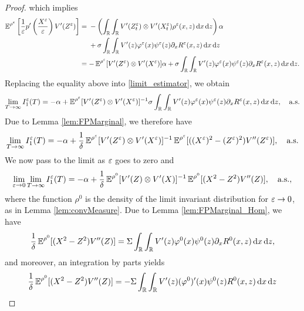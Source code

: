 \documentclass[10pt]{article}
\begin{document}
\begin{proof}
which implies
\begin{align}
	\operatorname{\mathbb{E}}^{\rho^\varepsilon} \left [ \frac{1}{\varepsilon} p' \left ( \frac{X^\varepsilon}{\varepsilon} \right ) V'(Z^\varepsilon) \right ] &= 
	\begin{aligned}[t]
		&- \left(\int_{\mathbb{R}} \int_{\mathbb{R}} V'(Z^\varepsilon_t) \otimes V'(X^\varepsilon_t) \rho^\varepsilon(x, z) \,\mathrm{d} x \,\mathrm{d} z\right) \alpha \\
		&+\sigma \int_{\mathbb{R}} \int_{\mathbb{R}} V'(z) \varphi^\varepsilon(x) \psi^\varepsilon(z) \partial_x R^\varepsilon(x,z) \,\mathrm{d} x \,\mathrm{d} z 
	\end{aligned}
	\\
	&= -  \operatorname{\mathbb{E}}^{\rho^\varepsilon} [ V'(Z^\varepsilon) \otimes V'(X^\varepsilon) ]\alpha + \sigma \int_{\mathbb{R}} \int_{\mathbb{R}} V'(z) \varphi^\varepsilon(x) \psi^\varepsilon(z) \partial_x R^\varepsilon(x,z) \,\mathrm{d} x \,\mathrm{d} z.
\end{align}
Replacing the equality above into \eqref{limit_estimator}, we obtain
\begin{equation}
\lim_{T \to \infty} I_1^\varepsilon(T) = -\alpha + \operatorname{\mathbb{E}}^{\rho^\varepsilon} [ V'(Z^\varepsilon) \otimes V'(X^\varepsilon) ]^{-1} \sigma \int_{\mathbb{R}} \int_{\mathbb{R}} V'(z) \varphi^\varepsilon(x) \psi^\varepsilon(z) \partial_x R^\varepsilon(x,z) \,\mathrm{d} x \,\mathrm{d} z, \quad \text{a.s.}
\end{equation}
Due to Lemma \ref{lem:FPMarginal}, we therefore have
\begin{equation}
	\lim_{T \to \infty} I_1^\varepsilon(T) = -\alpha + \frac1\delta \operatorname{\mathbb{E}}^{\rho^\varepsilon} [ V'(Z^\varepsilon) \otimes V'(X^\varepsilon) ]^{-1} \operatorname{\mathbb{E}}^{\rho^\varepsilon}[((X^\varepsilon)^2 - (Z^\varepsilon)^2)V''(Z^\varepsilon)], \quad \text{a.s.}	
\end{equation}
We now pass to the limit as $\varepsilon$ goes to zero and
\begin{equation} \label{limit_estimator_2}
	\lim_{\varepsilon \to 0} \lim_{T \to \infty} I_1^\varepsilon(T) = -\alpha + \frac1\delta \operatorname{\mathbb{E}}^{\rho^0} [ V'(Z) \otimes V'(X) ]^{-1} \operatorname{\mathbb{E}}^{\rho^0}[(X^2 - Z^2)V''(Z)], \quad \text{a.s.},
\end{equation}
where the function $\rho^0$ is the density of the limit invariant distribution for $\varepsilon \to 0$, as in Lemma \ref{lem:convMeasure}. Due to Lemma \ref{lem:FPMarginal_Hom}, we have
\begin{equation}\label{eq:final_result}
	\frac{1}{\delta} \operatorname{\mathbb{E}}^{\rho^0}[(X^2 - Z^2)V''(Z)] = \Sigma \int_{\mathbb{R}} \int_{\mathbb{R}} V'(z) \varphi^0(x) \psi^0(z) \partial_x R^0(x,z) \,\mathrm{d} x \,\mathrm{d} z,
\end{equation}
and moreover, an integration by parts yields
\begin{equation}
\begin{aligned}
	\frac{1}{\delta} \E^{\rho^0}[(X^2 - Z^2)V''(Z)] &= -\Sigma \int_{\R} \int_{\R} V'(z) (\phi^0)'(x) \psi^0(z) R^0(x,z) \dd x \dd z\\

\end{aligned}
\end{equation}
\end{proof}
\end{document}

